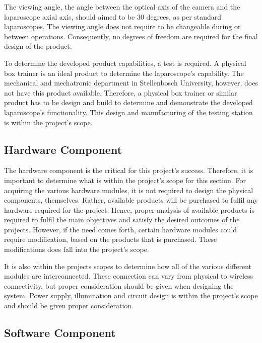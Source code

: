 \vspace{0.5cm}
\noindent
The viewing angle, the angle between the optical axis of the camera and the laparoscope axial axis, should aimed to be 30 degrees, as per standard laparoscopes. The viewing angle does not require to be changeable during or between operations. Consequently, no degrees of freedom are required for the final design of the product.

\vspace{0.5cm}
\noindent
To determine the developed product capabilities, a test is required. A physical box trainer is an ideal product to determine the laparoscope's capability. The mechanical and mechatronic department in Stellenbosch University, however, does not have this product available. Therefore, a physical box trainer or similar product has to be design and build to determine and demonstrate the developed laparoscope's functionality. This design and manufacturing of the testing station is within the project's scope. 

\subsection{Hardware Component}

The hardware component is the critical for this project's success. Therefore, it is important to determine what is within the project's scope for this section. For acquiring the various hardware modules, it is not required to design the physical components, themselves. Rather, available products will be purchased to fulfil any hardware required for the project. Hence, proper analysis of available products is required to fulfil the main objectives and satisfy the desired outcomes of the projects. However, if the need comes forth, certain hardware modules could require modification, based on the products that is purchased. These modifications does fall into the project's scope.

\vspace{0.5cm}
\noindent
It is also within the projects scopes to determine how all of the various different modules are interconnected. These connection can vary from physical to wireless connectivity, but proper consideration should be given when designing the system. Power supply, illumination and circuit design is within the project's scope and should be given proper consideration.

\subsection{Software Component}
\label{sec:Software Component}

